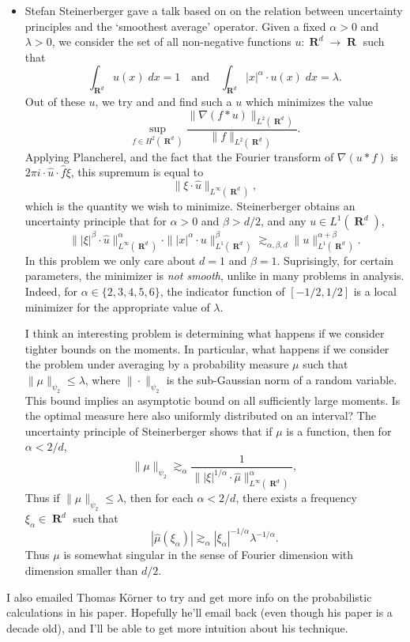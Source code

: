 \documentclass[openany,nobib,nols,a4paper,twoside,symmetric,justified,notoc]{tufte-book}
\theoremstyle{plain}
\theoremstyle{remark}
\theoremstyle{definition}
\DeclareMathOperator{\RR}{\mathbf{R}}
\begin{document}
\begin{itemize}
    \item Stefan Steinerberger gave a talk based on \cite{Steinerberger2020} on the relation between uncertainty principles and the `smoothest average' operator. Given a fixed $\alpha > 0$ and $\lambda > 0$, we consider the set of all non-negative functions $u: \RR^d \to \RR$ such that
    \[ \int_{\RR^d} u(x)\; dx = 1 \quad\text{and}\quad \int_{\RR^d} |x|^\alpha \cdot u(x)\; dx = \lambda. \]
    Out of these $u$, we try and and find such a $u$ which minimizes the value
    \[ \sup_{f \in H^2(\RR^d)} \frac{\| \nabla(f * u) \|_{L^2(\RR^d)}}{\| f \|_{L^2(\RR^d)}}. \]
    Applying Plancherel, and the fact that the Fourier transform of $\nabla (u * f)$ is $2 \pi i \cdot \widehat{u} \cdot \widehat{f} \xi$, this supremum is equal to
    \[ \| \xi \cdot \widehat{u} \|_{L^\infty(\RR^d)}, \]
    which is the quantity we wish to minimize. Steinerberger obtains an uncertainty principle that for $\alpha > 0$ and $\beta > d/2$, and any $u \in L^1(\RR^d)$,
    \[ \| |\xi|^\beta \cdot \widehat{u} \|_{L^\infty(\RR^d)}^\alpha \cdot \| |x|^\alpha \cdot u \|_{L^1(\RR^d)}^\beta \gtrsim_{\alpha,\beta,d} \| u \|_{L^1(\RR^d)}^{\alpha + \beta}. \]
    In this problem we only care about $d = 1$ and $\beta = 1$. Suprisingly, for certain parameters, the minimizer is \emph{not smooth}, unlike in many problems in analysis. Indeed, for $\alpha \in \{ 2,3,4,5,6 \}$, the indicator function of $[-1/2,1/2]$ is a local minimizer for the appropriate value of $\lambda$.

    I think an interesting problem is determining what happens if we consider tighter bounds on the moments. In particular, what happens if we consider the problem under averaging by a probability measure $\mu$ such that $\| \mu \|_{\psi_2} \leq \lambda$, where $\| \cdot \|_{\psi_2}$ is the sub-Gaussian norm of a random variable. This bound implies an asymptotic bound on all sufficiently large moments. Is the optimal measure here also uniformly distributed on an interval? The uncertainty principle of Steinerberger shows that if $\mu$ is a function, then for $\alpha < 2/d$,
    \[ \| \mu \|_{\psi_2} \gtrsim_\alpha \frac{1}{\| |\xi|^{1/\alpha} \cdot \widehat{\mu} \|_{L^\infty(\RR^d)}^\alpha}, \]
    Thus if $\| \mu \|_{\psi_2} \leq \lambda$, then for each $\alpha < 2/d$, there exists a frequency $\xi_\alpha \in \RR^d$ such that
    \[ |\widehat{\mu}(\xi_\alpha)| \gtrsim_\alpha |\xi_\alpha|^{-1/\alpha} \lambda^{-1/\alpha}. \]
    Thus $\mu$ is somewhat singular in the sense of Fourier dimension with dimension smaller than $d/2$.
\end{itemize}
%
I also emailed Thomas K\"{o}rner to try and get more info on the probabilistic calculations in his paper. Hopefully he'll email back (even though his paper is a decade old), and I'll be able to get more intuition about his technique.








\end{document}
